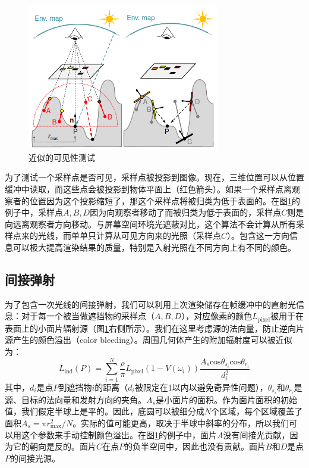 \documentclass[10pt,a4paper]{article}
\theoremstyle{mythm}%
\numberwithin{equation}{section}
\begin{document}
\begin{CJK*}{UTF8}{song}
\begin{figure}[htbp]
    \vspace{-1mm}
	\centering
  	\includegraphics[width=0.75\textwidth]{fig/occluder}
    \vspace{-4mm}
  	\caption{近似的可见性测试}
  	\label{fig:occluder}
    \vspace{-1mm}
\end{figure}

为了测试一个采样点是否可见，采样点被投影到图像。现在，三维位置可以从位置缓冲中读取，而这些点会被投影到物体平面上（红色箭头）。如果一个采样点离观察者的位置因为这个投影缩短了，那这个采样点将被归类为低于表面的。在图\ref{fig:occluder}的例子中，采样点$A,B,D$因为向观察者移动了而被归类为低于表面的，采样点$C$则是向远离观察者方向移动。与屏幕空间环境光遮蔽对比，这个算法不会计算从所有采样点来的光线，而单单只计算从可见方向来的光照（采样点$C$）。包含这一方向信息可以极大提高渲染结果的质量，特别是入射光照在不同方向上有不同的颜色。

\subsection{间接弹射}

为了包含一次光线的间接弹射，我们可以利用上次渲染储存在帧缓冲中的直射光信息：对于每一个被当做遮挡物的采样点（$A,B,D$），对应像素的颜色$L_{\text{pixel}}$被用于在表面上的小面片辐射源（图\ref{fig:occluder}右侧所示）。我们在这里考虑源的法向量，防止逆向片源产生的颜色溢出（color bleeding）。周围几何体产生的附加辐射度可以被近似为：
\begin{equation*}
L_{\text{ind}}(P)=\sum^N_{i=1}\frac{\rho}{\pi}L_{\text{pixel}}(1-V(\omega_i))\frac{A_s\text{cos}\theta_{s_i}\text{cos}\theta_{r_i}}{d^2_i}
\end{equation*}
其中，$d_i$是点$P$到遮挡物$i$的距离（$d_i$被限定在1以内以避免奇异性问题），$\theta_{s_i}$和$\theta_{r_i}$是源、目标的法向量和发射方向的夹角。$A_s$是小面片的面积。作为面片面积的初始值，我们假定半球上是平的。因此，底圆可以被细分成$N$个区域，每个区域覆盖了面积$A_s=\pi r^2_{\text{max}}/N$。实际的值可能更高，取决于半球中斜率的分布，所以我们可以用这个参数来手动控制颜色溢出。在图\ref{fig:occluder}的例子中，面片$A$没有间接光贡献，因为它的朝向是反的。面片$C$在点$P$的负半空间中，因此也没有贡献。面片$B$和$D$是点$P$的间接光源。


\end{CJK*}
\end{document}
